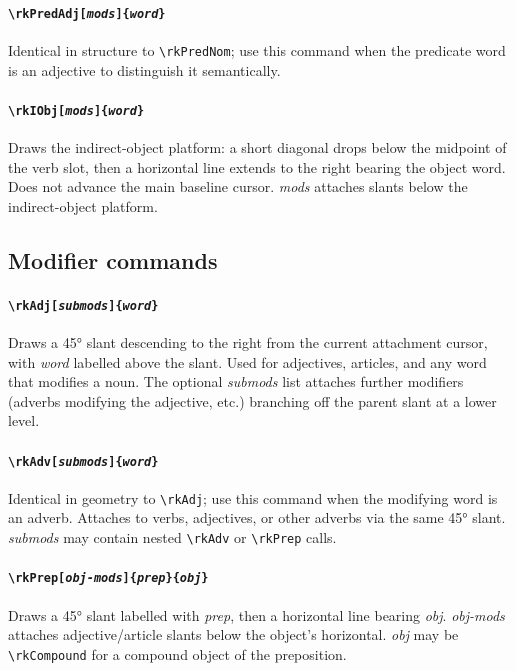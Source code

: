 \documentclass[11pt]{article}
\newcommand{\cmd}[1]{\texttt{\textbackslash #1}}
\begin{document}
\paragraph{\cmd{rkPredAdj[\textit{mods}]\{\textit{word}\}}}
Identical in structure to \cmd{rkPredNom}; use this command when the
predicate word is an adjective to distinguish it semantically.

\paragraph{\cmd{rkIObj[\textit{mods}]\{\textit{word}\}}}
Draws the indirect-object platform: a short diagonal drops below the
midpoint of the verb slot, then a horizontal line extends to the right
bearing the object word.  Does not advance the main baseline cursor.
\textit{mods} attaches slants below the indirect-object platform.

\subsection*{Modifier commands}

\paragraph{\cmd{rkAdj[\textit{submods}]\{\textit{word}\}}}
Draws a 45° slant descending to the right from the current attachment
cursor, with \textit{word} labelled above the slant.  Used for adjectives,
articles, and any word that modifies a noun.  The optional \textit{submods}
list attaches further modifiers (adverbs modifying the adjective, etc.)
branching off the parent slant at a lower level.

\paragraph{\cmd{rkAdv[\textit{submods}]\{\textit{word}\}}}
Identical in geometry to \cmd{rkAdj}; use this command when the modifying
word is an adverb.  Attaches to verbs, adjectives, or other adverbs via the
same 45° slant.  \textit{submods} may contain nested \cmd{rkAdv} or
\cmd{rkPrep} calls.

\paragraph{\cmd{rkPrep[\textit{obj-mods}]\{\textit{prep}\}\{\textit{obj}\}}}
Draws a 45° slant labelled with \textit{prep}, then a horizontal line
bearing \textit{obj}.  \textit{obj-mods} attaches adjective/article slants
below the object's horizontal.  \textit{obj} may be \cmd{rkCompound} for a
compound object of the preposition.
\end{document}
